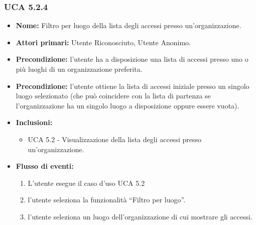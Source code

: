 \subsubsection{UCA 5.2.4}
\begin{itemize}
    \item \textbf{Nome:} Filtro per luogo della lista degli accessi presso un’organizzazione.
    \item \textbf{Attori primari:} Utente Riconosciuto, Utente Anonimo.
    \item \textbf{Precondizione:} l’utente ha a disposizione una lista di accessi presso uno o più luoghi di un organizzazione preferita.
    \item \textbf{Precondizione:} l’utente ottiene la lista di accessi iniziale presso un singolo luogo selezionato (che può coincidere con la lista di partenza se l’organizzazione ha un singolo luogo a disposizione oppure essere vuota).
    \item \textbf{Inclusioni:} %
    \begin{itemize}
        \item UCA 5.2 - Visualizzazione della lista degli accessi presso un'organizzazione.
    \end{itemize}
    \item \textbf{Flusso di eventi:}
    \begin{enumerate}
        \item L'utente esegue il caso d'uso UCA 5.2
        \item l’utente seleziona la funzionalità “Filtro per luogo”.
        \item l’utente seleziona un luogo dell’organizzazione di cui mostrare gli accessi.
    \end{enumerate}
\end{itemize}